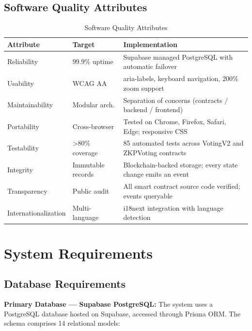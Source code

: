 \documentclass[oneside,a4paper,12pt]{book}
\begin{document}
\subsection{Software Quality Attributes}

\begin{table}[htbp]
\centering
\renewcommand{\arraystretch}{1.3}
\small
\begin{tabularx}{\textwidth}{|p{3cm}|p{3cm}|X|}
\hline
\textbf{Attribute} & \textbf{Target} & \textbf{Implementation} \\
\hline
Reliability & 99.9\% uptime & Supabase managed PostgreSQL with automatic failover \\
\hline
Usability & WCAG AA & aria-labels, keyboard navigation, 200\% zoom support \\
\hline
Maintainability & Modular arch. & Separation of concerns (contracts / backend / frontend) \\
\hline
Portability & Cross-browser & Tested on Chrome, Firefox, Safari, Edge; responsive CSS \\
\hline
Testability & >80\% coverage & 85 automated tests across VotingV2 and ZKPVoting contracts \\
\hline
Integrity & Immutable records & Blockchain-backed storage; every state change emits an event \\
\hline
Transparency & Public audit & All smart contract source code verified; events queryable \\
\hline
Internationalization & Multi-language & i18next integration with language detection \\
\hline
\end{tabularx}
\caption{Software Quality Attributes}
\label{tab:quality}
\end{table}

\section{System Requirements}

\subsection{Database Requirements}

\textbf{Primary Database --- Supabase PostgreSQL:} The system uses a PostgreSQL database hosted on Supabase, accessed through Prisma ORM. The schema comprises 14 relational models:
\end{document}
